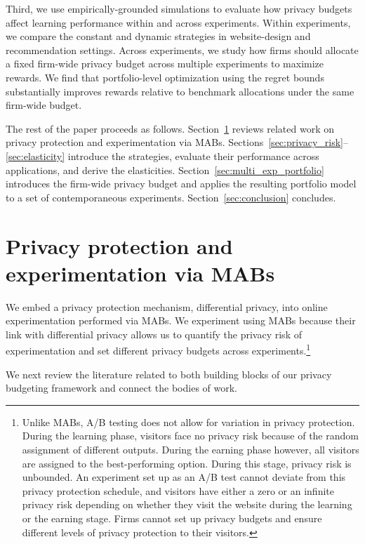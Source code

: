 \documentclass[mksc,nonblindrev]{informs3}
\begin{document}
Third, we use empirically-grounded simulations to evaluate how privacy budgets affect learning performance within and across experiments. Within experiments, we compare the constant and dynamic strategies in website-design and recommendation settings. Across experiments, we study how firms should allocate a fixed firm-wide privacy budget across multiple experiments to maximize rewards. We find that portfolio-level optimization using the regret bounds substantially improves rewards relative to benchmark allocations under the same firm-wide budget.

The rest of the paper proceeds as follows. Section~\ref{sec:related_work} reviews related work on privacy protection and experimentation via MABs. Sections~\ref{sec:privacy_risk}--\ref{sec:elasticity} introduce the strategies, evaluate their performance across applications, and derive the elasticities. Section~\ref{sec:multi_exp_portfolio} introduces the firm-wide privacy budget and applies the resulting portfolio model to a set of contemporaneous experiments. Section~\ref{sec:conclusion} concludes.

\section{Privacy protection and experimentation via MABs}\label{sec:related_work}
We embed a privacy protection mechanism, differential privacy, into online experimentation performed via MABs. We experiment using MABs because their link with differential privacy allows us to quantify the privacy risk of experimentation and set different privacy budgets across experiments.\footnote{Unlike MABs, A/B testing does not allow for variation in privacy protection. During the learning phase, visitors face no privacy risk because of the random assignment of different outputs. During the earning phase however, all visitors are assigned to the best-performing option. During this stage, privacy risk is unbounded. An experiment set up as an A/B test cannot deviate from this privacy protection schedule, and visitors have either a zero or an infinite privacy risk depending on whether they visit the website during the learning or the earning stage. Firms cannot set up privacy budgets and ensure different levels of privacy protection to their visitors.} 

We next review the literature related to both building blocks of our privacy budgeting framework and connect the bodies of work. 
\end{document}
